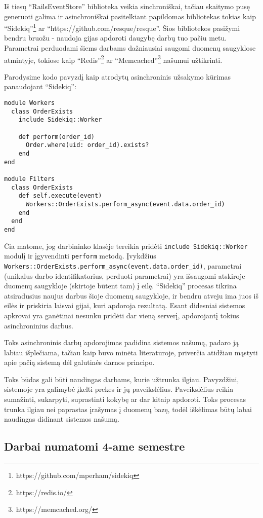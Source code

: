 Iš tiesų ``RailsEventStore'' biblioteka veikia sinchroniškai, tačiau skaitymo pusę generuoti galima ir asinchroniškai pasitelkiant papildomas bibliotekas tokias kaip ``Sidekiq''\footnote{https://github.com/mperham/sidekiq} ar ``https://github.com/resque/resque''. Šios bibliotekos pasižymi bendru bruožu - naudoja gijas apdoroti daugybę darbų tuo pačiu metu. Parametrai perduodami šiems darbams dažniausiai saugomi duomenų saugyklose atmintyje, tokiose kaip ``Redis''\footnote{https://redis.io/} ar ``Memcached''\footnote{https://memcached.org/} našumui užtikrinti.

Parodysime kodo pavyzdį kaip atrodytų asinchroninis užsakymo kūrimas panaudojant ``Sidekiq'':

\begin{lstlisting}
module Workers
  class OrderExists
    include Sidekiq::Worker

    def perform(order_id)
      Order.where(uid: order_id).exists?
    end
end

module Filters
  class OrderExists
    def self.execute(event)
      Workers::OrderExists.perform_async(event.data.order_id)
    end
  end
end
\end{lstlisting}

Čia matome, jog darbininko klasėje tereikia pridėti \lstinline|include Sidekiq::Worker| modulį ir įgyvendinti \lstinline|perform| metodą. Įvykdžius \lstinline|Workers::OrderExists.perform_async(event.data.order_id)|, parametrai (unikalus darbo identifikatorius, perduoti parametrai) yra išsaugomi atskiroje duomenų saugykloje (skirtoje būtent tam) į eilę. ``Sidekiq'' procesas tikrina atsiradusius naujus darbus šioje duomenų saugykloje, ir bendru atveju ima juos iš eilės ir priskiria laisvai gijai, kuri apdoroja rezultatą. Esant didesniai sistemos apkrovai yra ganėtinai nesunku pridėti dar vieną serverį, apdorojantį tokius asinchroninius darbus.

Toks asinchroninis darbų apdorojimas padidina sistemos našumą, padaro ją labiau išplečiama, tačiau kaip buvo minėta literatūroje, priverčia atidžiau mąstyti apie pačią sistemą dėl galutinės darnos principo.

Toks būdas gali būti naudingas darbams, kurie užtrunka ilgiau. Pavyzdžiui, sistemoje yra galimybė įkelti prekes ir jų paveikslėlius. Paveikslėlius reikia sumažinti, sukarpyti, suprastinti kokybę ar dar kitaip apdoroti. Toks procesas trunka ilgiau nei paprastas įrašymas į duomenų bazę, todėl iškėlimas būtų labai naudingas didinant sistemos našumą.

\subsection{Darbai numatomi 4-ame semestre}

